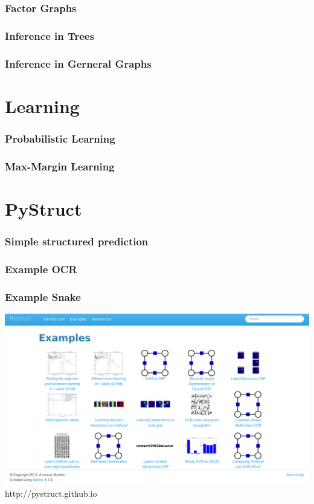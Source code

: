 \documentclass{beamer}
\begin{document}
    \begin{frame}
        \frametitle{Factor Graphs}
    \end{frame}

    \begin{frame}
        \frametitle{Inference in Trees}
    \end{frame}

    \begin{frame}
        \frametitle{Inference in Gerneral Graphs}
    \end{frame}

    \section{Learning}
    \begin{frame}
        \frametitle{Probabilistic Learning}
    \end{frame}
    \begin{frame}
        \frametitle{Max-Margin Learning}
    \end{frame}


    \section{PyStruct}
    \begin{frame}
        \frametitle{Simple structured prediction}
    \end{frame}

    \begin{frame}
        \frametitle{Example OCR}
    \end{frame}

    \begin{frame}
        \frametitle{Example Snake}
    \end{frame}

    \begin{frame}
        \begin{center}
            \includegraphics[width=\linewidth]{images/example_gallery}\\
            http://pystruct.github.io
        \end{center}
    \end{frame}
    
	
\end{document}
